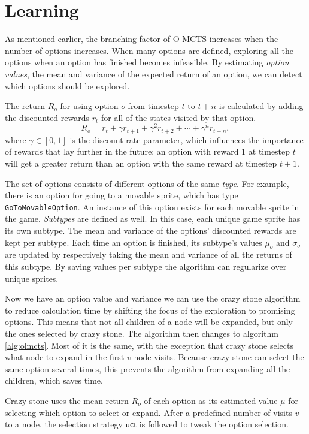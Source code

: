 \section{Learning}
\label{sec:learning}
As mentioned earlier, the branching factor of O-MCTS increases when the number
of options increases. When many options are defined, exploring all the options
when an option has finished becomes infeasible. By estimating
\emph{option values}, the mean and variance of the expected return of an option,
we can detect which options should be explored.

The return $R_o$ for using option $o$ from timestep $t$ to $t+n$ is calculated
by adding the discounted rewards $r_t$ for all of the states visited by that
option.  $$R_o = r_{t} + \gamma r_{t+1} + \gamma^2 r_{t+2} + \cdots + \gamma^n
r_{t+n},$$ where $\gamma \in [0, 1]$ is the discount rate parameter, which
influences the importance of rewards that lay further in the future: an option
with reward 1 at timestep $t$ will get a greater return than an option with the
same reward at timestep $t+1$.  

The set of options consists of different options of the same \emph{type}. For example,
there is an option for going to a movable sprite, which has type
\texttt{GoToMovableOption}. An instance of this option exists for each movable
sprite in the game. \emph{Subtypes} are defined as well. In this case, each
unique game sprite has its own subtype. The mean and variance of the options'
discounted rewards are kept per subtype. Each time an option is finished, its
subtype's values $\mu_o$ and $\sigma_o$ are updated by respectively taking the
mean and variance of all the returns of this subtype. By saving values per
subtype the algorithm can regularize over unique sprites.

Now we have an option value and variance we can use the crazy stone algorithm
to reduce calculation time by shifting the focus of the exploration to promising
options. This means that not all children of a node will be expanded, but only
the ones selected by crazy stone. The algorithm then changes to algorithm
\ref{alg:olmcts}. Most of it is the same, with the exception that crazy stone
selects what node to expand in the first $v$ node visits. Because crazy stone
can select the same option several times, this prevents the algorithm from
expanding all the children, which saves time. 

Crazy stone uses the mean return $R_o$ of each option as its estimated value
$\mu$ for selecting which option to select or expand. After a predefined number
of visits $v$ to a node, the selection strategy $\mathsf{uct}$ is followed to
tweak the option selection.

